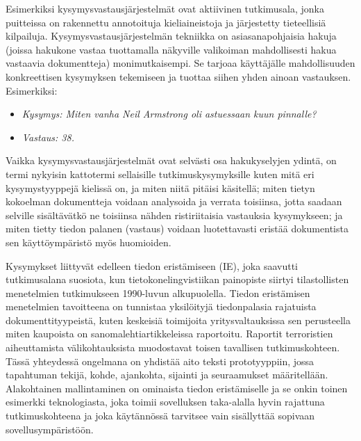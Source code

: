\documentclass[]{../../metanetpaper}
\begin{document}
\begin{Parallel}[c]{77mm}{77mm}
{Esimerkiksi kysymysvastausjärjestelmät ovat aktiivinen tutkimusala,
jonka puitteissa on rakennettu annotoituja kieliaineistoja ja
järjestetty tieteellisiä kilpailuja. Kysymysvastausjärjestelmän
tekniikka on asiasanapohjaisia hakuja (joissa hakukone vastaa
tuottamalla näkyville valikoiman mahdollisesti hakua vastaavia
dokumentteja) monimutkaisempi. Se tarjoaa käyttäjälle mahdollisuuden
konkreettisen kysymyksen tekemiseen ja tuottaa siihen yhden ainoan
vastauksen. Esimerkiksi:
\begin{itemize}
\item[] \textit{Kysymys: Miten vanha Neil Armstrong oli astuessaan
 kuun pinnalle?}

\item[] \textit{Vastaus: 38.}
\end{itemize}

Vaikka kysymysvastausjärjestelmät ovat selvästi osa hakukyselyjen
ydintä, on termi nykyisin kattotermi sellaisille tutkimuskysymyksille
kuten mitä eri kysymystyyppejä kielissä on, ja miten niitä pitäisi
käsitellä; miten tietyn kokoelman dokumentteja voidaan analysoida ja
verrata toisiinsa, jotta saadaan selville sisältävätkö ne toisiinsa
nähden ristiriitaisia vastauksia kysymykseen; ja miten tietty tiedon
palanen (vastaus) voidaan luotettavasti eristää dokumentista sen
käyttöympäristö myös huomioiden.

Kysymykset liittyvät edelleen tiedon eristämiseen (IE), joka saavutti
tutkimusalana suosiota, kun tietokonelingvistiikan painopiste siirtyi
tilastollisten menetelmien tutkimukseen 1990-luvun
alkupuolella. Tiedon eristämisen menetelmien tavoitteena on tunnistaa
yksilöityjä tiedonpalasia rajatuista dokumenttityypeistä, kuten
keskeisiä toimijoita yritysvaltauksissa sen perusteella miten
kaupoista on sanomalehtiartikkeleissa raportoitu.  Raportit
terroristien aiheuttamista välikohtauksista muodostavat toisen
tavallisen tutkimuskohteen. Tässä yhteydessä ongelmana on yhdistää
aito teksti prototyyppiin, jossa tapahtuman tekijä, kohde, ajankohta,
sijainti ja seuraamukset määritellään. Alakohtainen mallintaminen on
ominaista tiedon eristämiselle ja se onkin toinen esimerkki
teknologiasta, joka toimii sovelluksen taka-alalla hyvin rajattuna
tutkimuskohteena ja joka käytännössä tarvitsee vain sisällyttää
sopivaan sovellusympäristöön.


}
\end{Parallel}
\end{document}
